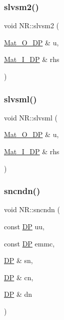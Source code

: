 \subsubsection{\texorpdfstring{slvsm2()}{slvsm2()}}
{\footnotesize\ttfamily void N\+R\+::slvsm2 (\begin{DoxyParamCaption}\item[{\mbox{\hyperlink{namespaceNR_adc1f8da33094b6bbeb1f5f899515ce54}{Mat\+\_\+\+O\+\_\+\+DP}} \&}]{u,  }\item[{\mbox{\hyperlink{namespaceNR_a2b8abfda8fffad6ba0a1b5a4c0773dbf}{Mat\+\_\+\+I\+\_\+\+DP}} \&}]{rhs }\end{DoxyParamCaption})}

\mbox{\label{namespaceNR_ae63f80a859ca5a86551c9b2f4b04fdef}} 
\subsubsection{\texorpdfstring{slvsml()}{slvsml()}}
{\footnotesize\ttfamily void N\+R\+::slvsml (\begin{DoxyParamCaption}\item[{\mbox{\hyperlink{namespaceNR_adc1f8da33094b6bbeb1f5f899515ce54}{Mat\+\_\+\+O\+\_\+\+DP}} \&}]{u,  }\item[{\mbox{\hyperlink{namespaceNR_a2b8abfda8fffad6ba0a1b5a4c0773dbf}{Mat\+\_\+\+I\+\_\+\+DP}} \&}]{rhs }\end{DoxyParamCaption})}

\mbox{\label{namespaceNR_a047d02acf11afe02da3c1da8c748e208}} 
\subsubsection{\texorpdfstring{sncndn()}{sncndn()}}
{\footnotesize\ttfamily void N\+R\+::sncndn (\begin{DoxyParamCaption}\item[{const \mbox{\hyperlink{namespaceNR_af6ff762dd605ff477b8e52387253a02a}{DP}}}]{uu,  }\item[{const \mbox{\hyperlink{namespaceNR_af6ff762dd605ff477b8e52387253a02a}{DP}}}]{emmc,  }\item[{\mbox{\hyperlink{namespaceNR_af6ff762dd605ff477b8e52387253a02a}{DP}} \&}]{sn,  }\item[{\mbox{\hyperlink{namespaceNR_af6ff762dd605ff477b8e52387253a02a}{DP}} \&}]{cn,  }\item[{\mbox{\hyperlink{namespaceNR_af6ff762dd605ff477b8e52387253a02a}{DP}} \&}]{dn }\end{DoxyParamCaption})}

